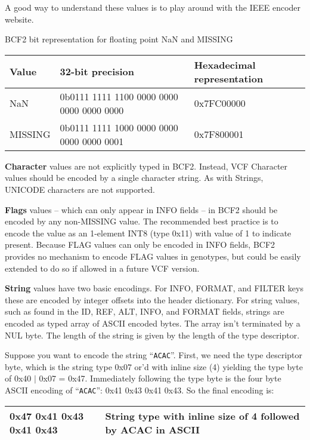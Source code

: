 \documentclass[8pt]{article}
\begin{document}
A good way to understand these values is to play around with the IEEE encoder website.

\vspace{0.3cm}
BCF2 bit representation for floating point NaN and MISSING

\vspace{0.1cm}
\begin{tabular}{| l | l | l |} \hline
Value & 32-bit precision & Hexadecimal representation \\ \hline
NaN	& 0b0111 1111 1100 0000 0000 0000 0000 0000 & 0x7FC00000 \\ \hline
MISSING &	0b0111 1111 1000 0000 0000 0000 0000 0001 & 0x7F800001 \\ \hline
\end{tabular}

\vspace{0.3cm}
\textbf{Character} values are not explicitly typed in BCF2.  Instead, VCF Character values should be encoded by a single character string.  As with Strings, UNICODE characters are not supported.

\vspace{0.3cm}
\textbf{Flags} values -- which can only appear in INFO fields -- in BCF2 should be encoded by any non-MISSING value.  The recommended best practice is to encode the value as an 1-element INT8 (type 0x11) with value of 1 to indicate present.  Because FLAG values can only be encoded in INFO fields, BCF2 provides no mechanism to encode FLAG values in genotypes, but could be easily extended to do so if allowed in a future VCF version.

\vspace{0.3cm}
\textbf{String} values have two basic encodings.
For INFO, FORMAT, and FILTER keys these are encoded by integer offsets into the header dictionary.
For string values, such as found in the ID, REF, ALT, INFO, and FORMAT fields, strings are encoded as typed array of ASCII encoded bytes.
The array isn't terminated by a NUL byte.
The length of the string is given by the length of the type descriptor.

Suppose you want to encode the string ``{\tt ACAC}''.  First, we need the type descriptor byte, which is the string type 0x07 or'd with inline size (4) yielding the type byte of 0x40 $|$ 0x07 = 0x47.  Immediately following the type byte is the four byte ASCII encoding of ``{\tt ACAC}'': 0x41 0x43 0x41 0x43.  So the final encoding is:

\vspace{0.1cm}
\begin{tabular}{| l | l |} \hline
0x47 0x41 0x43 0x41 0x43 & String type with inline size of 4 followed by ACAC in ASCII \\ \hline
\end{tabular}
\vspace{0.3cm}
\end{document}
